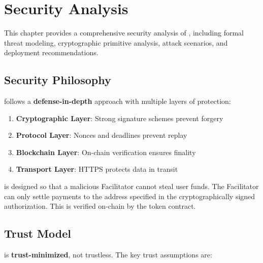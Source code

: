 \chapter{Security Analysis}
\label{ch:security}

This chapter provides a comprehensive security analysis of \tprotocol{}, including formal threat modeling, cryptographic primitive analysis, attack scenarios, and deployment recommendations.

\section{Security Philosophy}
\label{sec:security-philosophy}

\tprotocol{} follows a \textbf{defense-in-depth} approach with multiple layers of protection:

\begin{enumerate}
    \item \textbf{Cryptographic Layer}: Strong signature schemes prevent forgery
    \item \textbf{Protocol Layer}: Nonces and deadlines prevent replay
    \item \textbf{Blockchain Layer}: On-chain verification ensures finality
    \item \textbf{Transport Layer}: HTTPS protects data in transit
\end{enumerate}

\begin{infobox}
\tprotocol{} is designed so that a malicious Facilitator cannot steal user funds. The Facilitator can only settle payments to the  address specified in the cryptographically signed authorization. This is verified on-chain by the token contract.
\end{infobox}

\section{Trust Model}
\label{sec:trust-model}

\tprotocol{} is \textbf{trust-minimized}, not trustless. The key trust assumptions are:

